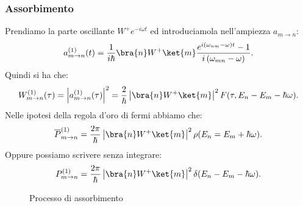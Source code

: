 \subsubsection{Assorbimento}%
Prendiamo la parte oscillante $W^+e^{-i\omega t}$ ed introduciamola nell'ampiezza $a_{m\to n}$:
\[
    a_{m\to n}^{(1)}(t) =
    \frac{1}{i\hbar }\bra{n}W^+ \ket{m} \frac{e^{i(\omega_{nm}-\omega )t}-1}{i\left( \omega_{mn}-\omega\right)}
.\] 
Quindi si ha che:
\[
    W^{(1) }_{m\to n}(\tau) =
    \left|a^{(1)}_{m\to n}(\tau) \right|^2 =
    \frac{2}{\hbar }\left|\bra{n}W^+ \ket{m}\right|^2 F(\tau,E_n-E_m - \hbar \omega) 
.\] 
Nelle ipotesi della regola d'oro di fermi abbiamo che:
\[
    \overline{P}^{(1)}_{m\to n} = \frac{2\pi}{\hbar }\left|\bra{n}W^+ \ket{m}\right|^2\rho(E_n=E_m+\hbar \omega) 
.\] 
Oppure possiamo scrivere senza integrare:
\[
    P^{(1)}_{m\to n} = \frac{2\pi}{\hbar }\left|\bra{n}W^+ \ket{m}\right|^2\delta (E_n-E_m-\hbar \omega) 
.\] 
\begin{figure}[H]
    \centering
    \caption{Processo di assorbimento}
    \label{fig:processo-di-assorbimento}
\end{figure}
\noindent
